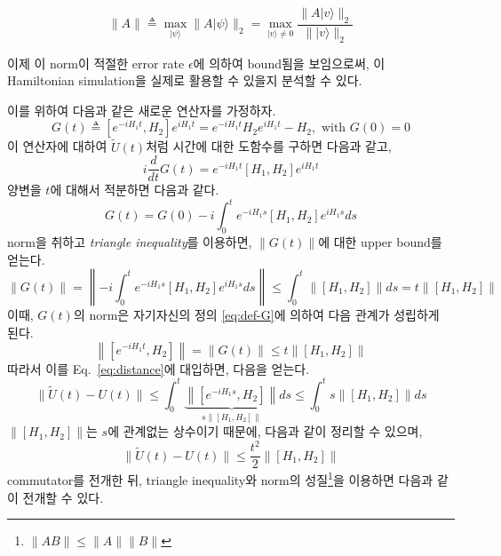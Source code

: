 \begin{definition}
  $$  \|A\| \triangleq \max _{|\psi\rangle} \| A|\psi\rangle \|_2=\max _{|v\rangle \ne 0} \frac{\| A|v \rangle \|_2}{\||v\rangle \|_2} $$
\end{definition}

이제 이 norm이 적절한 error rate $\epsilon$에 의하여 bound됨을 보임으로써, 이 Hamiltonian simulation을 실제로 활용할 수 있을지 분석할 수 있다. 

\newpage 
이를 위하여 다음과 같은 새로운 연산자를 가정하자.
\begin{equation}
  G(t) \triangleq [e^{-iH_1t}, H_2] e^{iH_1t} = e^{-i H_1t} H_2 e^{iH_1t} - H_2, \text{ with } G(0) = 0 \label{eq:def-G}
\end{equation}
이 연산자에 대하여 $\tilde U(t)$처럼 시간에 대한 도함수를 구하면 다음과 같고,
\begin{equation*}
  i \frac{d}{d t} G(t)=e^{-i H_1 t}\left[H_1, H_2\right] e^{i H_1 t}
\end{equation*}
양변을 $t$에 대해서 적분하면 다음과 같다. 
\begin{equation*}
  G(t)=G(0) - i \int_{0}^{t} e^{-i H_1 s}\left[H_1, H_2\right] e^{i H_1 s} ds 
\end{equation*}
norm을 취하고 \textit{triangle inequality}를 이용하면, $\|G(t)\|$에 대한 upper bound를 얻는다.
\begin{equation}
  \|G(t) \|=  \left\| -i \int^t_0 e^{-i H_1 s}\left[H_1, H_2\right] e^{i H_1 s} ds \right\| \le \int^t_0 \|\left[H_1, H_2\right]\| ds = t \|\left[H_1, H_2\right]\| \label{eq:G-bound}
\end{equation}
이때, $G(t)$의 norm은 자기자신의 정의 \eqref{eq:def-G}에 의하여 다음 관계가 성립하게 된다.
\begin{equation*}
  \left\|\left[e^{-i H_1 t}, H_2\right]\right\|=\|G(t)\| \leq t\left\|\left[H_1, H_2\right]\right\| 
\end{equation*}
따라서 이를 Eq.~\eqref{eq:distance}에 대입하면, 다음을 얻는다.
\begin{equation*}
  \|\tilde{U}(t)-U(t)\|  \leq \int_0^t \underbrace{\left\|\left[e^{-i H_1 s}, H_2\right]\right\|}_{s\|[H_1, H_2]\|} d s  \leq \int^t_0 s\left\|\left[H_1, H_2\right]\right\|  ds  
\end{equation*}
$\|[H_1, H_2]\|$는 $s$에 관계없는 상수이기 때문에, 다음과 같이 정리할 수 있으며, 
\begin{equation*}
  \|\tilde{U}(t)-U(t)\| \leq \frac{t^2}{2} \left\|\left[H_1, H_2\right]\right\|
\end{equation*}
commutator를 전개한 뒤, triangle inequality와 norm의 성질\footnote{$\|AB\| \le \|A\| \|B\|$}을 이용하면 다음과 같이 전개할 수 있다.
